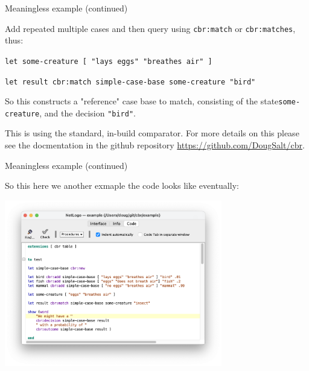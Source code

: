 \documentclass[usenames,dvipsnames,10pt]{beamer} %
\begin{document}
\begin{frame}{Meaningless example (continued)}

    Add repeated multiple cases and then query using \texttt{{\color{blue}cbr:match}} or  \texttt{{\color{blue}cbr:matches}}, thus:

    \vspace{0.5cm}
    \small

    \texttt{let some-creature [ {\color{red}"lays eggs" "breathes air"} ]}

    \texttt{let result {\color{blue}cbr:match} simple-case-base some-creature {\color{red}"bird"}}

    \vspace{0.5cm}

    \normalsize
    So this constructs a "reference" case base to match, consisting of the state\texttt{some-creature}, and the decision \texttt{\color{red}"bird"}.

    \vspace{0.25cm}
    This is using the standard, in-build comparator. For more details on this please see the docmentation in the github repository \url{https://github.com/DougSalt/cbr}.

\end{frame}

\begin{frame}{Meaningless example (continued)}

    So this here we another exmaple the code looks like eventually:

    \includegraphics[width=9.5cm]{img/simple-example-code.png}

\end{frame}
\end{document}
